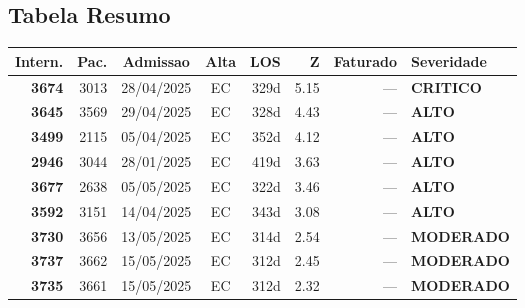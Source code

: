\documentclass[a4paper,10pt]{article}
\begin{document}
\subsection{Tabela Resumo}
\begin{center}
\begin{longtable}{>{\scriptsize}r>{\scriptsize}r>{\scriptsize}c>{\scriptsize}c>{\scriptsize}r>{\scriptsize}r>{\scriptsize}r>{\scriptsize}l}
\toprule
\textbf{Intern.} & \textbf{Pac.} & \textbf{Admissao} & \textbf{Alta} & \textbf{LOS} & \textbf{Z} & \textbf{Faturado} & \textbf{Severidade} \\
\midrule
\endhead
\bottomrule
\endfoot

\textcolor{anomred}{\textbf{3674}} & 3013 & 28/04/2025 & \textcolor{anomorange}{EC} & 329d & \textcolor{anomred}{5.15} & --- & \textcolor{anomred}{\textbf{CRITICO}} \\

\textcolor{anomorange}{\textbf{3645}} & 3569 & 29/04/2025 & \textcolor{anomorange}{EC} & 328d & \textcolor{anomorange}{4.43} & --- & \textcolor{anomorange}{\textbf{ALTO}} \\

\textcolor{anomorange}{\textbf{3499}} & 2115 & 05/04/2025 & \textcolor{anomorange}{EC} & 352d & \textcolor{anomorange}{4.12} & --- & \textcolor{anomorange}{\textbf{ALTO}} \\

\textcolor{anomorange}{\textbf{2946}} & 3044 & 28/01/2025 & \textcolor{anomorange}{EC} & 419d & \textcolor{anomorange}{3.63} & --- & \textcolor{anomorange}{\textbf{ALTO}} \\

\textcolor{anomorange}{\textbf{3677}} & 2638 & 05/05/2025 & \textcolor{anomorange}{EC} & 322d & \textcolor{anomorange}{3.46} & --- & \textcolor{anomorange}{\textbf{ALTO}} \\

\textcolor{anomorange}{\textbf{3592}} & 3151 & 14/04/2025 & \textcolor{anomorange}{EC} & 343d & \textcolor{anomorange}{3.08} & --- & \textcolor{anomorange}{\textbf{ALTO}} \\

\textcolor{anomyellow}{\textbf{3730}} & 3656 & 13/05/2025 & \textcolor{anomorange}{EC} & 314d & \textcolor{anomyellow}{2.54} & --- & \textcolor{anomyellow}{\textbf{MODERADO}} \\

\textcolor{anomyellow}{\textbf{3737}} & 3662 & 15/05/2025 & \textcolor{anomorange}{EC} & 312d & \textcolor{anomyellow}{2.45} & --- & \textcolor{anomyellow}{\textbf{MODERADO}} \\

\textcolor{anomyellow}{\textbf{3735}} & 3661 & 15/05/2025 & \textcolor{anomorange}{EC} & 312d & \textcolor{anomyellow}{2.32} & --- & \textcolor{anomyellow}{\textbf{MODERADO}} \\

\end{longtable}\end{center}
\end{document}
